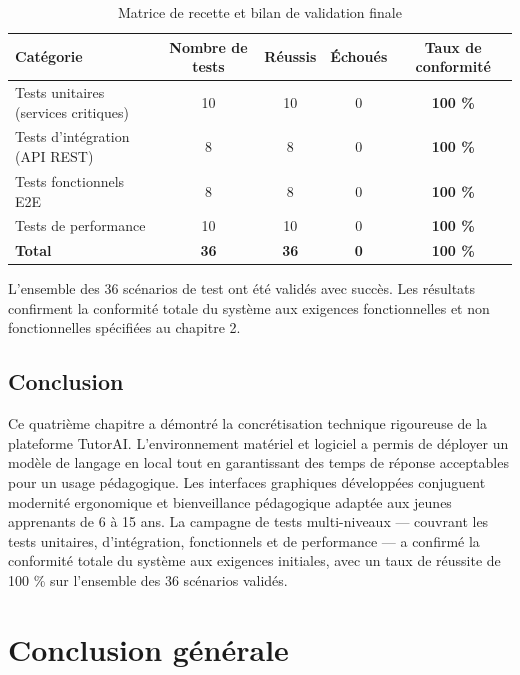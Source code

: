 \documentclass[12pt,a4paper]{report}
\begin{document}
\begin{table}[H]
\centering
\caption{Matrice de recette et bilan de validation finale}
\label{tab:bilan_tests}
\begin{tabular}{|l|c|c|c|c|}
\hline
\rowcolor{LightGray}
\textbf{Catégorie} & \textbf{Nombre de tests} & \textbf{Réussis} & \textbf{Échoués} & \textbf{Taux de conformité} \\ \hline
Tests unitaires (services critiques) & 10 & 10 & 0 & \textbf{100 \%} \\ \hline
Tests d'intégration (API REST) & 8 & 8 & 0 & \textbf{100 \%} \\ \hline
Tests fonctionnels E2E & 8 & 8 & 0 & \textbf{100 \%} \\ \hline
Tests de performance & 10 & 10 & 0 & \textbf{100 \%} \\ \hline
\textbf{Total} & \textbf{36} & \textbf{36} & \textbf{0} & \textbf{100 \%} \\ \hline
\end{tabular}
\end{table}

\noindent
L'ensemble des 36 scénarios de test ont été validés avec succès. Les résultats confirment la conformité totale du système aux exigences fonctionnelles et non fonctionnelles spécifiées au chapitre 2.

\section{Conclusion}
Ce quatrième chapitre a démontré la concrétisation technique rigoureuse de la plateforme TutorAI. L'environnement matériel et logiciel a permis de déployer un modèle de langage en local tout en garantissant des temps de réponse acceptables pour un usage pédagogique. Les interfaces graphiques développées conjuguent modernité ergonomique et bienveillance pédagogique adaptée aux jeunes apprenants de 6 à 15 ans. La campagne de tests multi-niveaux --- couvrant les tests unitaires, d'intégration, fonctionnels et de performance --- a confirmé la conformité totale du système aux exigences initiales, avec un taux de réussite de 100 \% sur l'ensemble des 36 scénarios validés.

\chapter*{Conclusion générale}
\end{document}

